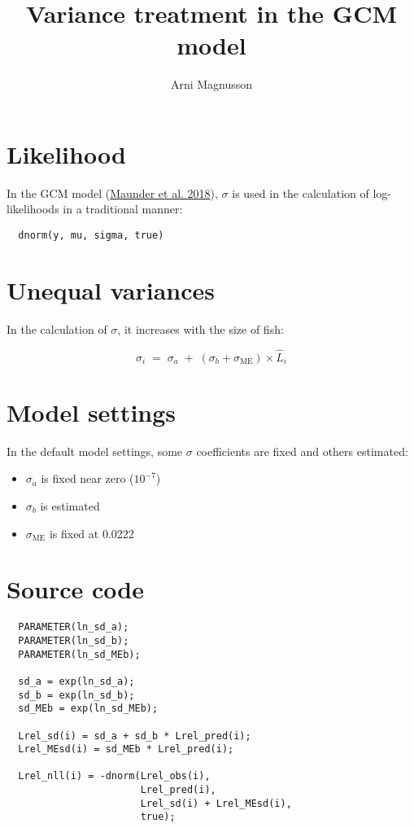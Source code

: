 \documentclass[fleqn]{article}
\begin{document}
\title{Variance treatment in the GCM model}
\author{Arni Magnusson}
\maketitle

\section*{Likelihood}

In the GCM model (\textcolor[rgb]{0,0.1,0.5}%
{\href{https://doi.org/10.1007/s00227-018-3336-9}{Maunder et al. 2018}}),
$\sigma$ is used in the calculation of log-likelihoods in a traditional manner:

\begin{verbatim}
  dnorm(y, mu, sigma, true)
\end{verbatim}

\section*{Unequal variances}

In the calculation of $\sigma$, it increases with the size of fish:

\begin{displaymath}
  \sigma_i \;=\; \sigma_a \;+\; (\sigma_b + \sigma_\mathrm{ME})\times \hat L_i
\end{displaymath}

\section*{Model settings}

In the default model settings, some $\sigma$ coefficients are fixed and others
estimated:

\begin{itemize}
  \item[] $\sigma_a$ is fixed near zero ($10^{-7}$)
  \item[] $\sigma_b$ is estimated
  \item[] $\sigma_\mathrm{ME}$ is fixed at 0.0222
\end{itemize}

\section*{Source code}

\begin{verbatim}
  PARAMETER(ln_sd_a);
  PARAMETER(ln_sd_b);
  PARAMETER(ln_sd_MEb);

  sd_a = exp(ln_sd_a);
  sd_b = exp(ln_sd_b);
  sd_MEb = exp(ln_sd_MEb);

  Lrel_sd(i) = sd_a + sd_b * Lrel_pred(i);
  Lrel_MEsd(i) = sd_MEb * Lrel_pred(i);

  Lrel_nll(i) = -dnorm(Lrel_obs(i),
                       Lrel_pred(i),
                       Lrel_sd(i) + Lrel_MEsd(i),
                       true);
\end{verbatim}
\end{document}
